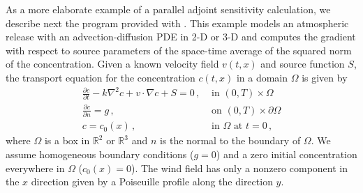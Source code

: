 As a more elaborate example of a parallel adjoint sensitivity calculation,
we describe next the program  provided
with {\cvodes}. This example models an atmospheric 
release with an advection-diffusion PDE in 2-D or 3-D and computes the gradient 
with respect to source parameters of the space-time average of the squared norm
of the concentration.
Given a known velocity field $v(t,x)$ and source function $S$, the  transport
equation for the concentration $c(t,x)$ in a domain $\Omega$ is given by
\begin{equation}\label{e:cvs_atm_disp_asai_kry_bbd_p_PDE}
  \begin{split}
    \frac{\partial c}{\partial t} - k \nabla^2 c + v \cdot \nabla c + S = 0 \, , 
    &\text{ in } (0,T) \times \Omega \\
    \frac{\partial c}{\partial n} = g \, ,
    &\text{ on } (0,T) \times \partial\Omega \\
    c = c_0(x) \, ,
    &\text{ in } \Omega \text{ at } t = 0 \, ,
  \end{split}
\end{equation}
where $\Omega$ is a box in ${\mathbb{R}}^2$ or ${\mathbb{R}}^3$ and $n$ is the 
normal to the boundary of $\Omega$.
We assume homogeneous boundary conditions ($g = 0$) and a zero initial
concentration everywhere in $\Omega$ ($c_0(x) = 0$). The wind field has only a
nonzero component in the $x$ direction given by a Poiseuille profile along the 
direction $y$.

